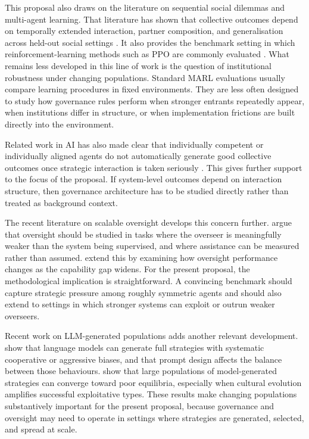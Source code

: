 \documentclass[10pt]{article}
\begin{document}
This proposal also draws on the literature on sequential social dilemmas and multi-agent learning. That literature has shown that collective outcomes depend on temporally extended interaction, partner composition, and generalisation across held-out social settings \citep{leibo2017, meltingpot2021, socialjax2025}. It also provides the benchmark setting in which reinforcement-learning methods such as PPO are commonly evaluated \citep{schulman2017}. What remains less developed in this line of work is the question of institutional robustness under changing populations. Standard MARL evaluations usually compare learning procedures in fixed environments. They are less often designed to study how governance rules perform when stronger entrants repeatedly appear, when institutions differ in structure, or when implementation frictions are built directly into the environment.

Related work in AI has also made clear that individually competent or individually aligned agents do not automatically generate good collective outcomes once strategic interaction is taken seriously \citep{conitzer2023}. This gives further support to the focus of the proposal. If system-level outcomes depend on interaction structure, then governance architecture has to be studied directly rather than treated as background context.

The recent literature on scalable oversight develops this concern further. \citet{bowman2022} argue that oversight should be studied in tasks where the overseer is meaningfully weaker than the system being supervised, and where assistance can be measured rather than assumed. \citet{engels2025} extend this by examining how oversight performance changes as the capability gap widens. For the present proposal, the methodological implication is straightforward. A convincing benchmark should capture strategic pressure among roughly symmetric agents and should also extend to settings in which stronger systems can exploit or outrun weaker overseers.

Recent work on LLM-generated populations adds another relevant development. \citet{willis2025} show that language models can generate full strategies with systematic cooperative or aggressive biases, and that prompt design affects the balance between those behaviours. \citet{willis2026} show that large populations of model-generated strategies can converge toward poor equilibria, especially when cultural evolution amplifies successful exploitative types. These results make changing populations substantively important for the present proposal, because governance and oversight may need to operate in settings where strategies are generated, selected, and spread at scale.
\end{document}
